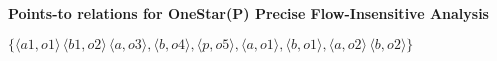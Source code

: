 \documentclass[12pt]{article}
\begin{document}
\begin{enumerate}
\begin{mdframed}
        \textbf{Points-to relations for OneStar(P) Precise Flow-Insensitive Analysis}

        $\{\langle a1, o1 \rangle\, \langle b1, o2 \rangle\, \langle a, o3 \rangle, \langle b, o4 \rangle, \langle p, o5 \rangle, \langle a, o1 \rangle, \langle b, o1 \rangle, \langle a, o2 \rangle \, \langle b, o2 \rangle \}$
  \end{mdframed}

\end{enumerate}
    
\end{document}
